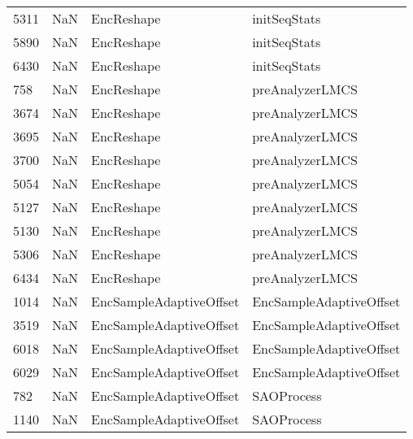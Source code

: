 \begin{tabular}{llll}
5311 &                   NaN &                 EncReshape &                              initSeqStats \\
5890 &                   NaN &                 EncReshape &                              initSeqStats \\
6430 &                   NaN &                 EncReshape &                              initSeqStats \\
758  &                   NaN &                 EncReshape &                           preAnalyzerLMCS \\
3674 &                   NaN &                 EncReshape &                           preAnalyzerLMCS \\
3695 &                   NaN &                 EncReshape &                           preAnalyzerLMCS \\
3700 &                   NaN &                 EncReshape &                           preAnalyzerLMCS \\
5054 &                   NaN &                 EncReshape &                           preAnalyzerLMCS \\
5127 &                   NaN &                 EncReshape &                           preAnalyzerLMCS \\
5130 &                   NaN &                 EncReshape &                           preAnalyzerLMCS \\
5306 &                   NaN &                 EncReshape &                           preAnalyzerLMCS \\
6434 &                   NaN &                 EncReshape &                           preAnalyzerLMCS \\
1014 &                   NaN &    EncSampleAdaptiveOffset &                   EncSampleAdaptiveOffset \\
3519 &                   NaN &    EncSampleAdaptiveOffset &                   EncSampleAdaptiveOffset \\
6018 &                   NaN &    EncSampleAdaptiveOffset &                   EncSampleAdaptiveOffset \\
6029 &                   NaN &    EncSampleAdaptiveOffset &                   EncSampleAdaptiveOffset \\
782  &                   NaN &    EncSampleAdaptiveOffset &                                SAOProcess \\
1140 &                   NaN &    EncSampleAdaptiveOffset &                                SAOProcess \\

\end{tabular}
